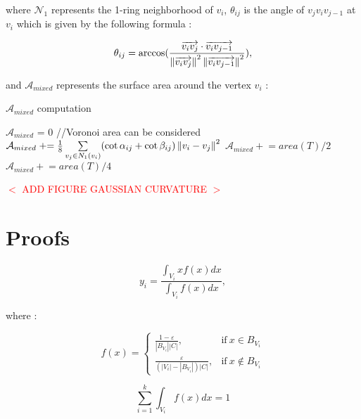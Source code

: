\documentclass[11pt,fleqn]{book} %
\newcommand{\arnaud}[1]{\textcolor{red}{$<$ #1 $>$}}
\begin{document}
\begin{appendices}
where $\mathcal{N}_1$ represents the 1-ring neighborhood of $v_i$, $\theta_{ij}$ is the angle of $v_jv_iv_{j-1}$ at $v_i$ which is given by the following formula : 

\begin{equation}
	\theta_{ij} = \arccos(\frac{\overrightarrow{v_iv_j} \cdot \overrightarrow{v_i v_{j-1}}}
	{\left\lVert\overrightarrow{v_iv_j}\right\rVert^2\left\lVert\overrightarrow{v_iv_{j-1}}\right\rVert^2}),
\end{equation} 

and $\mathcal{A}_{mixed}$ represents the surface area around the vertex $v_i$ : 

\begin{algorithm}
\caption{$\mathcal{A}_{mixed}$ computation}
\begin{algorithmic}
\State $\mathcal{A}_{mixed}$ = 0
		//Voronoi area can be considered
		\State $\mathcal{A}_{mixed} \mathrel{+}= \frac{1}{8} \sum\limits_{v_j \in N_1(v_i)} (\cot \alpha_{ij} + \cot \beta_{ij}) \left\lVert v_i-v_j\right\rVert^2$
	\Else
			\State $\mathcal{A}_{mixed} \mathrel{+}= area(T)/2$
		\Else
			\State $\mathcal{A}_{mixed} \mathrel{+}= area(T)/4$
		\EndIf
	\EndIf
\EndFor
\end{algorithmic}
\end{algorithm}

\arnaud{ADD FIGURE GAUSSIAN CURVATURE}

\section{Proofs}

\begin{equation}
	y_i = \frac{\int_{V_i}xf(x)dx}{\int_{V_i}f(x)dx},
\end{equation}

where : 

\begin{equation}
	f(x) = 
    \begin{cases}
      \frac{1-\varepsilon}{|B_{V_i}||C|}, & \text{if}\ x \in B_{V_i} \\
      \frac{\varepsilon}{(|V_i|-|B_{V_i}|)|C|}, & \text{if}\ x \not\in B_{V_i}
    \end{cases}
\end{equation}

\begin{equation}
	\sum_{i=1}^k \int_{V_i}f(x)dx = 1
\end{equation}


\end{appendices}
\end{document}
